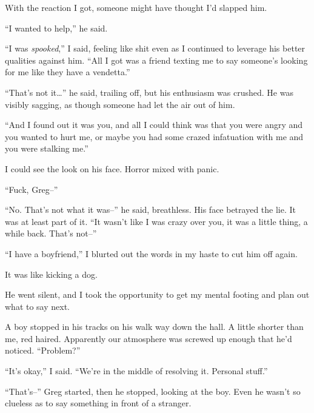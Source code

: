 With the reaction I got, someone might have thought I'd slapped him.



``I wanted to help,'' he said.



``I was \emph{spooked},'' I said, feeling like shit even as I continued to leverage his better qualities against him.  ``All I got was a friend texting me to say someone's looking for me like they have a vendetta.''



``That's not it\ldots'' he said, trailing off, but his enthusiasm was crushed.  He was visibly sagging, as though someone had let the air out of him.



``And I found out it was you, and all I could think was that you were angry and you wanted to hurt me, or maybe you had some crazed infatuation with me and you were stalking me.''



I could see the look on his face.  Horror mixed with panic.



``Fuck, Greg--''



``No.  That's not what it was--'' he said, breathless.  His face betrayed the lie.  It was at least part of it.  ``It wasn't like I was crazy over you, it was a little thing, a while back.  That's not--''



``I have a boyfriend,'' I blurted out the words in my haste to cut him off again.



It was like kicking a dog.



He went silent, and I took the opportunity to get my mental footing and plan out what to say next.



A boy stopped in his tracks on his walk way down the hall.  A little shorter than me, red haired.  Apparently our atmosphere was screwed up enough that he'd noticed.  ``Problem?''



``It's okay,'' I said.  ``We're in the middle of resolving it.  Personal stuff.''



``That's--'' Greg started, then he stopped, looking at the boy.  Even he wasn't so clueless as to say something in front of a stranger.



